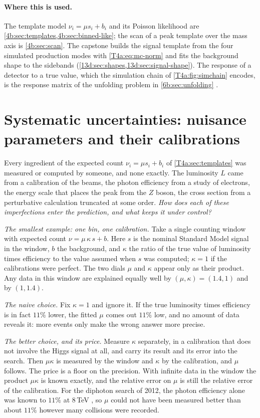 \paragraph{Where this is used.}
The template model $\nu_i=\mu s_i+b_i$ and its Poisson likelihood are \cref{4b:sec:templates,4b:sec:binned-like}; the scan of a peak template over the mass axis is \cref{4b:sec:scan}. The capstone builds the signal template from the four simulated production modes with \eqref{T4a:eq:mc-norm} and fits the background shape to the sidebands (\cref{13d:sec:shapes,13d:sec:signal-shape}). The response of a detector to a true value, which the simulation chain of \cref{T4a:fig:simchain} encodes, is the response matrix of the unfolding problem in \cref{6b:sec:unfolding} .
\section{Systematic uncertainties: nuisance parameters and their calibrations}
\label{T4a:sec:nuisance}

Every ingredient of the expected count $\nu_i=\mu s_i+b_i$ of \cref{T4a:sec:templates} was measured or computed by someone, and none exactly. The luminosity $L$ came from a calibration of the beams, the photon efficiency from a study of electrons, the energy scale that places the peak from the $Z$ boson, the cross section from a perturbative calculation truncated at some order. \emph{How does each of these imperfections enter the prediction, and what keeps it under control?}

\emph{The smallest example: one bin, one calibration.} Take a single counting window with expected count $\nu=\mu\,\kappa\,s+b$. Here $s$ is the nominal Standard Model signal in the window, $b$ the background, and $\kappa$ the ratio of the true value of luminosity times efficiency to the value assumed when $s$ was computed; $\kappa=1$ if the calibrations were perfect. The two dials $\mu$ and $\kappa$ appear only as their product. Any data in this window are explained equally well by $(\mu,\kappa)=(1.4,1)$ and by $(1,1.4)$.

\emph{The naive choice.} Fix $\kappa=1$ and ignore it. If the true luminosity times efficiency is in fact $11\%$ lower, the fitted $\mu$ comes out $11\%$ low, and no amount of data reveals it: more events only make the wrong answer more precise.

\emph{The better choice, and its price.} Measure $\kappa$ separately, in a calibration that does not involve the Higgs signal at all, and carry its result and its error into the search. Then $\mu\kappa$ is measured by the window and $\kappa$ by the calibration, and $\mu$ follows. The price is a floor on the precision. With infinite data in the window the product $\mu\kappa$ is known exactly, and the relative error on $\mu$ is still the relative error of the calibration. For the diphoton search of 2012, the photon efficiency alone was known to $11\%$ at $8$\,TeV \cite[Sec.~5.6]{AadHiggs2012}, so $\mu$ could not have been measured better than about $11\%$ however many collisions were recorded.

